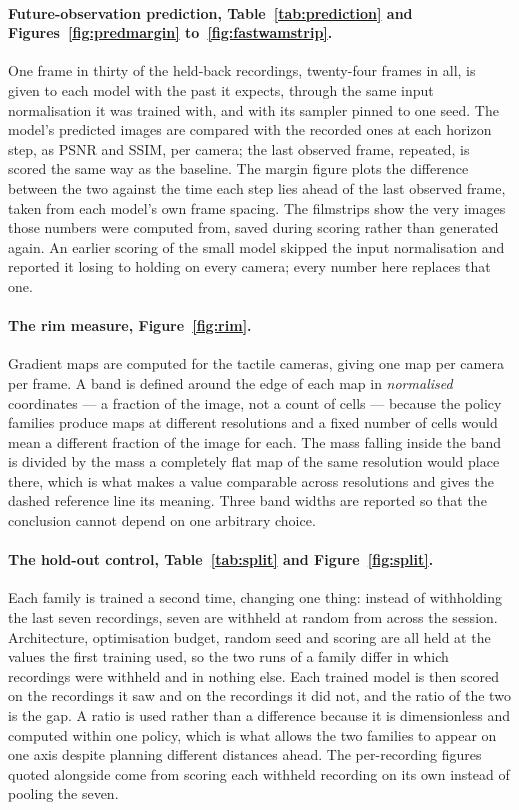 \paragraph{Future-observation prediction, Table~\ref{tab:prediction} and
Figures~\ref{fig:predmargin} to~\ref{fig:fastwamstrip}.}
One frame in thirty of the held-back recordings, twenty-four frames in all, is
given to each model with the past it expects, through the same input
normalisation it was trained with, and with its sampler pinned to one seed.
The model's predicted images are compared with the recorded ones at each
horizon step, as PSNR and SSIM, per camera; the last observed frame, repeated,
is scored the same way as the baseline. The margin figure plots the difference
between the two against the time each step lies ahead of the last observed
frame, taken from each model's own frame spacing. The filmstrips show the very
images those numbers were computed from, saved during scoring rather than
generated again. An earlier scoring of the small model skipped the input
normalisation and reported it losing to holding on every camera; every number
here replaces that one.

\paragraph{The rim measure, Figure~\ref{fig:rim}.}
Gradient maps are computed for the tactile cameras, giving one map per camera
per frame. A band is defined around the edge of each map in \emph{normalised}
coordinates --- a fraction of the image, not a count of cells --- because the
policy families produce maps at different resolutions and a fixed number of
cells would mean a different fraction of the image for each. The mass falling
inside the band is divided by the mass a completely flat map of the same
resolution would place there, which is what makes a value comparable across
resolutions and gives the dashed reference line its meaning. Three band widths
are reported so that the conclusion cannot depend on one arbitrary choice.

\paragraph{The hold-out control, Table~\ref{tab:split} and
Figure~\ref{fig:split}.}
Each family is trained a second time, changing one thing: instead of withholding
the last seven recordings, seven are withheld at random from across the session.
Architecture, optimisation budget, random seed and scoring are all held at the
values the first training used, so the two runs of a family differ in which
recordings were withheld and in nothing else. Each trained model is then scored
on the recordings it saw and on the recordings it did not, and the ratio of the
two is the gap. A ratio is used rather than a difference because it is
dimensionless and computed within one policy, which is what allows the two
families to appear on one axis despite planning different distances ahead. The
per-recording figures quoted alongside come from scoring each withheld
recording on its own instead of pooling the seven.

